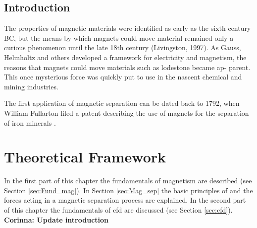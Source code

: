 


\section{Introduction}

The properties of magnetic materials were identified as early
as the sixth century BC, but the means by which magnets could
move material remained only a curious phenomenon until the late
18th century (Livingston, 1997). As Gauss, Helmholtz and others
developed a framework for electricity and magnetism, the reasons
that magnets could move materials such as lodestone became ap-
parent. This once mysterious force was quickly put to use in the
nascent chemical and mining industries. \cite{yavuz2009magnetic}

The first application of magnetic separation can be dated back to 1792, when William Fullarton filed a patent describing the use of magnets for the separation of iron minerals \cite{1794repertory}. 


\chapter{Theoretical Framework}
\label{chap:chap_theo}



In the first part of this chapter the fundamentals of magnetism are described (see Section \ref{sec:Fund_mag}). In Section \ref{sec:Mag_sep} the basic principles of and the forces acting in a magnetic separation process are explained.
In the second part of this chapter the fundamentals of \gls{cfd} are discussed (see Section \ref{sec:cfd}).  \textbf{Corinna: Update introduction}

